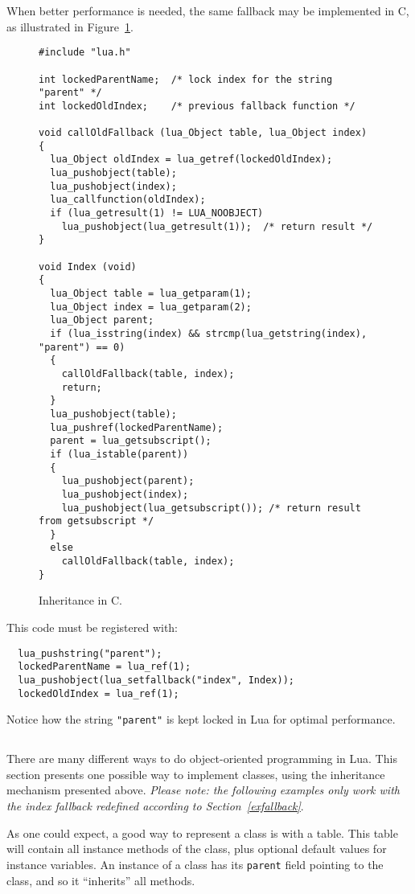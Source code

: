 When better performance is needed,
the same fallback may be implemented in C,
as illustrated in Figure~\ref{Cinher}.
\begin{figure}
\Line
\begin{verbatim}
#include "lua.h"

int lockedParentName;  /* lock index for the string "parent" */
int lockedOldIndex;    /* previous fallback function */

void callOldFallback (lua_Object table, lua_Object index)
{
  lua_Object oldIndex = lua_getref(lockedOldIndex);
  lua_pushobject(table);
  lua_pushobject(index);
  lua_callfunction(oldIndex);
  if (lua_getresult(1) != LUA_NOOBJECT)
    lua_pushobject(lua_getresult(1));  /* return result */
}

void Index (void)
{
  lua_Object table = lua_getparam(1);
  lua_Object index = lua_getparam(2);
  lua_Object parent;
  if (lua_isstring(index) && strcmp(lua_getstring(index), "parent") == 0)
  {
    callOldFallback(table, index);
    return;
  }
  lua_pushobject(table);
  lua_pushref(lockedParentName);
  parent = lua_getsubscript();
  if (lua_istable(parent))
  {
    lua_pushobject(parent);
    lua_pushobject(index);
    lua_pushobject(lua_getsubscript()); /* return result from getsubscript */
  }
  else
    callOldFallback(table, index);
}
\end{verbatim}
\caption{Inheritance in C.\label{Cinher}}
\Line
\end{figure}
This code must be registered with:
\begin{verbatim}
  lua_pushstring("parent");
  lockedParentName = lua_ref(1);
  lua_pushobject(lua_setfallback("index", Index));
  lockedOldIndex = lua_ref(1);
\end{verbatim}
Notice how the string \verb'"parent"' is kept
locked in Lua for optimal performance.

\subsection{}
There are many different ways to do object-oriented programming in Lua.
This section presents one possible way to
implement classes,
using the inheritance mechanism presented above.
{\em Please note: the following examples only work
with the index fallback redefined according to
Section~\ref{exfallback}}.

As one could expect, a good way to represent a class is
with a table.
This table will contain all instance methods of the class,
plus optional default values for instance variables.
An instance of a class has its \verb'parent' field pointing to
the class,
and so it ``inherits'' all methods.

